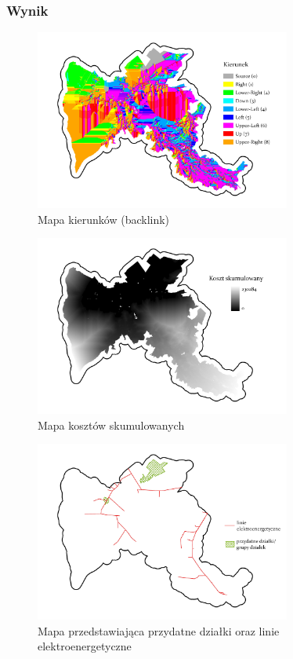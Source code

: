 \documentclass{article}
\begin{document}
\subsubsection{Wynik}

\begin{figure}[H]
    \centering
    \includegraphics[width=0.75\textwidth]{img/cost-backlink.jpg}
    \caption*{Mapa kierunków (backlink)}
\end{figure}

\begin{figure}[H]
    \centering
    \includegraphics[width=0.75\textwidth]{img/cost-distance.jpg}
    \caption*{Mapa kosztów skumulowanych}
\end{figure}

\begin{figure}[H]
    \centering
    \includegraphics[width=0.75\textwidth]{img/dzialki-linie.jpg}
    \caption*{Mapa przedstawiająca przydatne działki oraz linie elektroenergetyczne}
\end{figure}
\end{document}
